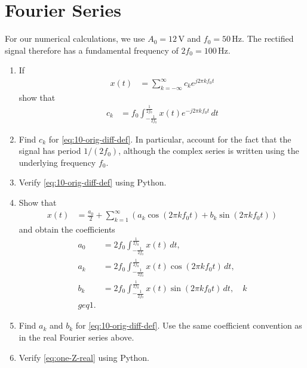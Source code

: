 \documentclass[journal,12pt,twocolumn]{IEEEtran}
\renewcommand\thesection{\arabic{section}}
\theoremstyle{definition}
\theoremstyle{remark}
\numberwithin{equation}{section}
\begin{document}
\section{Fourier Series}
For our numerical calculations, we use $A_0=12\,\mathrm{V}$ and $f_0=50\,\mathrm{Hz}$. The rectified signal therefore has a fundamental frequency of $2f_0=100\,\mathrm{Hz}$.
\begin{enumerate}[label=\thesection.\arabic*,
                  ref=\thesection.\theenumi]
    \item If
    \begin{align}
        x(t) &= \sum_{k=-\infty}^{\infty}c_ke^{j2\pi kf_0t}
        \label{eq:one-Z-complex}
    \end{align}
    show that
    \begin{align}
        c_k &= f_0\int_{-\frac{1}{2f_0}}^{\frac{1}{2f_0}}
        x(t)e^{-j2\pi kf_0t}\,dt
        \label{eq:one-Z}
    \end{align}

    \item Find $c_k$ for \eqref{eq:10-orig-diff-def}. In particular, account for the fact that the signal has period $1/(2f_0)$, although the complex series is written using the underlying frequency $f_0$.

    \item Verify \eqref{eq:10-orig-diff-def} using Python.

    \item Show that
    \begin{align}
        x(t) &= \frac{a_0}{2}+\sum_{k=1}^{\infty}
        \left(a_k\cos(2\pi kf_0t)+b_k\sin(2\pi kf_0t)\right)
        \label{eq:one-Z-real}
    \end{align}
    and obtain the coefficients
    \begin{align*}
        a_0 &= 2f_0\int_{-\frac{1}{2f_0}}^{\frac{1}{2f_0}}x(t)\,dt,\\
        a_k &= 2f_0\int_{-\frac{1}{2f_0}}^{\frac{1}{2f_0}}
        x(t)\cos(2\pi kf_0t)\,dt,\\
        b_k &= 2f_0\int_{-\frac{1}{2f_0}}^{\frac{1}{2f_0}}
        x(t)\sin(2\pi kf_0t)\,dt,\quad k\\geq 1.
    \end{align*}

    \item Find $a_k$ and $b_k$ for \eqref{eq:10-orig-diff-def}. Use the same coefficient convention as in the real Fourier series above.

    \item Verify \eqref{eq:one-Z-real} using Python.
\end{enumerate}
\end{document}
